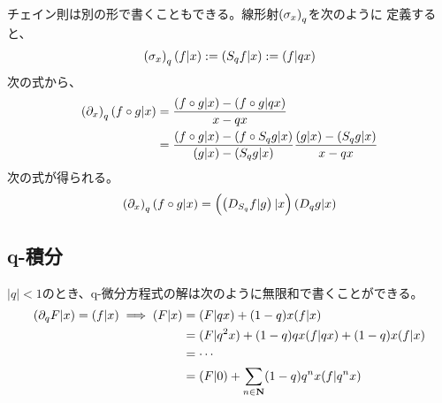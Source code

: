 {	チェイン則は別の形で書くこともできる。線形射$\mathinner{\left({\sigma_x}\right)}_q$を次のように
	定義すると、
	\begin{equation*}\begin{split}
		\mathinner{\left({\sigma_x}\right)}_q\mathinner{\left({f|x}\right)} := \mathinner{\left({S_qf|x}\right)} := \mathinner{\left({f|qx}\right)}
	\end{split}\end{equation*}
	次の式から、
	\begin{equation*}\begin{split}
		\mathinner{\left({\partial_x}\right)}_q\mathinner{\left({f\circ g|x}\right)}
		&= \frac{\mathinner{\left({f\circ g|x}\right)}-\mathinner{\left({f\circ g|qx}\right)}}{x-qx} \\
		&= \frac{\mathinner{\left({f\circ g|x}\right)}-\mathinner{\left({f\circ S_qg|x}\right)}}{\mathinner{\left({g|x}\right)} - \mathinner{\left({S_qg|x}\right)}} 
			\frac{\mathinner{\left({g|x}\right)} - \mathinner{\left({S_qg|x}\right)}}{x - qx} \\
	\end{split}\end{equation*}
	次の式が得られる。
	\begin{equation*}\begin{split}
		\mathinner{\left({\partial_x}\right)}_q\mathinner{\left({f\circ g|x}\right)} 
		= \mathinner{\Bigl({\mathinner{\left({D_{S_q}f|g}\right)}|x}\Bigr)}\mathinner{\left({D_qg|x}\right)}
	\end{split}\end{equation*}
\subsection{q-積分}\label{s2:q-積分} %
	$|q|<1$のとき、q-微分方程式の解は次のように無限和で書くことができる。
	\begin{equation*}\begin{split}
		(\partial_qF|x) = (f|x) \implies (F|x) &= (F|qx) + (1 - q)x(f|x) \\
		&= (F|q^2x) + (1 - q)qx(f|qx) +  (1 - q)x(f|x) \\
		&= \cdots \\
		&= (F|0) + \sum_{n\in\mathbf{N}} (1 - q)q^nx(f|q^nx)
	\end{split}\end{equation*}

}
